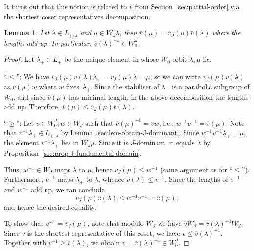 \documentclass[pdftex]{sigma}
\newtheorem{Lemma}[Theorem]{Lemma}
\theoremstyle{definition}
\numberwithin{equation}{section}
\begin{document}
It turns out that this notion is related to $\overline{v}$ from Section~\ref{sec:partial-order}
via the shortest coset representatives decomposition.

\begin{Lemma}\label{sec:lem-decompose-vs}
 Let $\lambda\in L_{+,J}$ and $\mu\in W_J\lambda$, then
$
 \overline{v}(\mu) = \overline{v}_J(\mu)\overline{v}(\lambda)
$
 where the lengths add up. In particular, $\overline{v}(\lambda)^{-1}\in W_0^J$.
\end{Lemma}
\begin{proof}
 Let $\lambda_+\in L_+$ be the unique element in whose $W_0$-orbit $\lambda,\mu$ lie.

``$\le$'': We have
$
 \overline{v}_J(\mu)\overline{v}(\lambda)\lambda_+
 =\overline{v}_J(\mu)\lambda = \mu$,
 so we can write $\overline{v}_J(\mu)\overline{v}(\lambda)$ as $\overline{v}(\mu)w$ where $w$ fixes~$\lambda_+$. Since
 the stabiliser of $\lambda_+$ is a parabolic subgroup of $W_0$, and since $\overline{v}(\mu)$ has minimal length, in the above
 decomposition the lengths add up. Therefore, $\overline{v}(\mu)\le \overline{v}_J(\mu)\overline{v}(\lambda)$.

``$\ge$'':
 Let $v\in W_0^J, w\in W_J$ such that $\overline{v}(\mu)^{-1}=vw$,
 i.e., $w^{-1}v^{-1} = \overline{v}(\mu)$. Note that
 $v^{-1}\lambda_+\in L_{+,J}$ by Lemma~\ref{sec:lem-obtain-J-dominant}.
 Since $w^{-1}v^{-1}\lambda_+=\mu$, the element $v^{-1}\lambda_+$ lies in $W_J\mu$. Since it is $J$-dominant,
 it equals $\lambda$ by Proposition~\ref{sec:prop-J-fundamental-domain}.

 Thus, $w^{-1}\in W_J$ maps $\lambda$ to $\mu$, hence
 $\overline{v}_J(\mu)\le w^{-1}$ (same argument as for ``$\le$'').
 Furthermore, $v^{-1}$ maps $\lambda_+$ to $\lambda$, whence $\overline{v}(\lambda)\le v^{-1}$.
 Since the lengths of $v^{-1}$ and
 $w^{-1}$ add up, we can conclude
 \[
 \overline{v}_J(\mu)\overline{v}(\lambda)
 \le w^{-1}v^{-1}=\overline{v}(\mu),
 \]
 and hence the desired equality.

 To show that $v^{-1}=\overline{v}_J(\mu)$, note that modulo $W_J$ we have
$
 vW_J = \overline{v}(\lambda)^{-1}W_J$.
 Since $v$ is the shortest representative of this coset, we have $v\le \overline{v}(\lambda)^{-1}$.
 Together with $v^{-1}\ge \overline{v}(\lambda)$, we obtain $v=\overline{v}(\lambda)^{-1}\in W_0^J$.
\end{proof}
\end{document}
